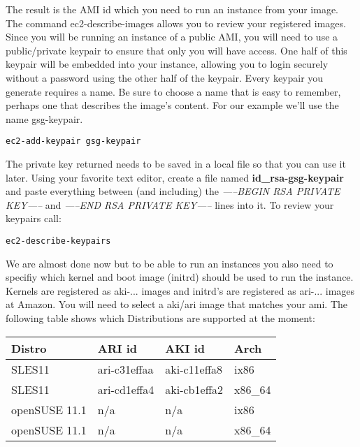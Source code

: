 The result is the AMI id which you need to run an instance from
your image. The command ec2-describe-images allows you to review your
registered images. Since you will be running an instance of a public AMI,
you will need to use a public/private keypair to ensure that only you
will have access. One half of this keypair will be embedded into your
instance, allowing you to login securely without a password using the
other half of the keypair. Every keypair you generate requires a name.
Be sure to choose a name that is easy to remember, perhaps one that
describes the image's content. For our example we'll use the name
gsg-keypair.

\begin{Command}{10cm}
\begin{verbatim}
ec2-add-keypair gsg-keypair
\end{verbatim}
\end{Command}

The private key returned needs to be saved in a local file so that
you can use it later. Using your favorite text editor, create a file
named \textbf{id\_rsa-gsg-keypair} and paste everything between
(and including) the \textit{-----BEGIN RSA PRIVATE KEY-----} and
\textit{-----END RSA PRIVATE KEY-----} lines into it. To review
your keypairs call:

\begin{Command}{10cm}
\begin{verbatim}
ec2-describe-keypairs
\end{verbatim}
\end{Command}

We are almost done now but to be able to run an instances you also need
to specifiy which kernel and boot image (initrd) should be used to run
the instance. Kernels are registered as aki-... images and initrd's
are registered as ari-... images at Amazon. You will need to select a
aki/ari image that matches your ami. The following table shows which
Distributions are supported at the moment:\\

\begin{tabular}[h]{|p{3cm}|p{2.6cm}|p{2.6cm}|p{2cm}|}
\hline
\textbf{Distro} & \textbf{ARI id} & \textbf{AKI id} & \textbf{Arch} \\
\hline
SLES11 & ari-c31effaa & aki-c11effa8 & ix86    \\
SLES11 & ari-cd1effa4 & aki-cb1effa2 & x86\_64 \\
openSUSE 11.1 & n/a & n/a & ix86 \\
openSUSE 11.1 & n/a & n/a & x86\_64 \\
\hline
\end{tabular}\\

